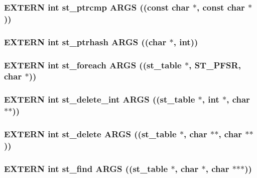 \subsubsection{\setlength{\rightskip}{0pt plus 5cm}EXTERN int st\_\-ptrcmp ARGS ((const char $\ast$, const char $\ast$))}\label{st_8h_2408b397d71f21efea146d58facd32d3}


\subsubsection{\setlength{\rightskip}{0pt plus 5cm}EXTERN int st\_\-ptrhash ARGS ((char $\ast$, int))}\label{st_8h_18e02e2425813a048f0c1d8786adaa8d}


\subsubsection{\setlength{\rightskip}{0pt plus 5cm}EXTERN int st\_\-foreach ARGS ((\bf{st\_\-table} $\ast$, \bf{ST\_\-PFSR}, char $\ast$))}\label{st_8h_07c813e8e82960cdd669385c8b65373e}


\subsubsection{\setlength{\rightskip}{0pt plus 5cm}EXTERN int st\_\-delete\_\-int ARGS ((\bf{st\_\-table} $\ast$, int $\ast$, char $\ast$$\ast$))}\label{st_8h_e4a5c6b2c1dcdcb55743f565dd7954bc}


\subsubsection{\setlength{\rightskip}{0pt plus 5cm}EXTERN int st\_\-delete ARGS ((\bf{st\_\-table} $\ast$, char $\ast$$\ast$, char $\ast$$\ast$))}\label{st_8h_0e1313ca092d9549ffe42b9c5b7ae723}


\subsubsection{\setlength{\rightskip}{0pt plus 5cm}EXTERN int st\_\-find ARGS ((\bf{st\_\-table} $\ast$, char $\ast$, char $\ast$$\ast$$\ast$))}\label{st_8h_a4825991eeb5eea72e551a126f755346}


